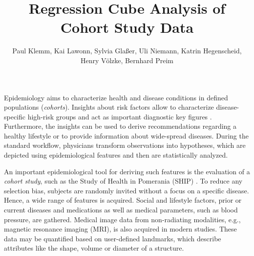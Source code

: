 \documentclass[journal]{style/vgtc} 			          %
\title{Regression Cube Analysis of Cohort Study Data}
\author{Paul Klemm, Kai Lawonn, Sylvia Gla{\ss}er, Uli Niemann, Katrin Hegenscheid, Henry V{\"o}lzke, Bernhard Preim}
\begin{document}


\maketitle
Epidemiology aims to characterize health and disease conditions in defined populations (\emph{cohorts}).
Insights about risk factors allow to characterize disease-specific high-risk groups and act as important diagnostic key figures \cite{Fletcher2012}.
Furthermore, the insights can be used to derive recommendations regarding a healthy lifestyle or to provide information about wide-spread diseases.
During the standard workflow, physicians transform observations into hypotheses, which are depicted using epidemiological features and then are statistically analyzed.

An important epidemiological tool for deriving such features is the evaluation of a \emph{cohort study}, such as the Study of Health in Pomerania (SHIP) \cite{Volzke2011}.
To reduce any selection bias, subjects are randomly invited without a focus on a specific disease.
Hence, a wide range of features is acquired.
%
Social and lifestyle factors, prior or current diseases and medications as well as medical parameters, such as blood pressure, are gathered.
Medical image data from non-radiating modalities, e.g., magnetic resonance imaging (MRI), is also acquired in modern studies.
These data may be quantified based on user-defined landmarks, which describe attributes like the shape, volume or diameter of a structure.
\end{document}
